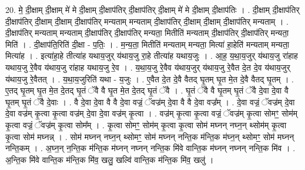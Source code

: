 \documentclass[17pt]{extarticle}
\begin{document}
20. मे॒ दी॒क्षाम् दी॒क्षाम् मे॑ मे दी॒क्षाम् दी॒क्षाप॑तिर् दी॒क्षाप॑तिर् दी॒क्षाम् मे॑ मे दी॒क्षाम् दी॒क्षाप॑तिः । . दी॒क्षाम् दी॒क्षाप॑तिर् दी॒क्षाप॑तिर् दी॒क्षाम् दी॒क्षाम् दी॒क्षाप॑तिर् मन्यताम् मन्यताम् दी॒क्षाप॑तिर् दी॒क्षाम् दी॒क्षाम् दी॒क्षाप॑तिर् मन्यताम् । . दी॒क्षाप॑तिर् मन्यताम् मन्यताम् दी॒क्षाप॑तिर् दी॒क्षाप॑तिर् मन्यता॒ मितीति॑ मन्यताम् दी॒क्षाप॑तिर् दी॒क्षाप॑तिर् मन्यता॒ मिति॑ । . दी॒क्षाप॑ति॒रिति॑ दी॒क्षा - प॒तिः॒ । . म॒न्य॒ता॒ मितीति॑ मन्यताम् मन्यता॒ मित्या॑ हा॒हेति॑ मन्यताम् मन्यता॒ मित्या॑ह । . इत्या॑हा॒हे तीत्या॑ह यथाय॒जुर् य॑थाय॒जु रा॒हे तीत्या॑ह यथाय॒जुः । . आ॒ह॒ य॒था॒य॒जुर् य॑थाय॒जु रा॑हाह यथाय॒जु रे॒वैव य॑थाय॒जु रा॑हाह यथाय॒जु रे॒व । . य॒था॒य॒जु रे॒वैव य॑थाय॒जुर् य॑थाय॒जु रे॒वैत दे॒त दे॒व य॑थाय॒जुर् य॑थाय॒जु रे॒वैतत् । . य॒था॒य॒जुरिति॑ यथा - य॒जुः । . ए॒वैत दे॒त दे॒वै वैतद् घृ॒तम् घृ॒त मे॒त दे॒वै वैतद् घृ॒तम् । . ए॒तद् घृ॒तम् घृ॒त मे॒त दे॒तद् घृ॒तं ॅवै वै घृ॒त मे॒त दे॒तद् घृ॒तं ॅवै । . घृ॒तं ॅवै वै घृ॒तम् घृ॒तं ॅवै दे॒वा दे॒वा वै घृ॒तम् घृ॒तं ॅवै दे॒वाः । . वै दे॒वा दे॒वा वै वै दे॒वा वज्रं॒ ॅवज्र॑म् दे॒वा वै वै दे॒वा वज्र᳚म् । . दे॒वा वज्रं॒ ॅवज्र॑म् दे॒वा दे॒वा वज्र॑म् कृ॒त्वा कृ॒त्वा वज्र॑म् दे॒वा दे॒वा वज्र॑म् कृ॒त्वा । . वज्र॑म् कृ॒त्वा कृ॒त्वा वज्रं॒ ॅवज्र॑म् कृ॒त्वा सोमꣳ॒॒ सोम॑म् कृ॒त्वा वज्रं॒ ॅवज्र॑म् कृ॒त्वा सोम᳚म् । . कृ॒त्वा सोमꣳ॒॒ सोम॑म् कृ॒त्वा कृ॒त्वा सोम॑ मघ्नन् नघ्न॒न् थ्सोम॑म् कृ॒त्वा कृ॒त्वा सोम॑ मघ्नन्न् । . सोम॑ मघ्नन् नघ्न॒न् थ्सोमꣳ॒॒ सोम॑ मघ्नन् नन्ति॒क म॑न्ति॒क म॑घ्न॒न् थ्सोमꣳ॒॒ सोम॑ मघ्नन् नन्ति॒कम् । . अ॒घ्न॒न् न॒न्ति॒क म॑न्ति॒क म॑घ्नन् नघ्नन् नन्ति॒क मि॑वे वान्ति॒क म॑घ्नन् नघ्नन् नन्ति॒क मि॑व । . अ॒न्ति॒क मि॑वे वान्ति॒क म॑न्ति॒क मि॑व॒ खलु॒ खल्वि॑ वान्ति॒क म॑न्ति॒क मि॑व॒ खलु॑ । \newline
\end{document}
